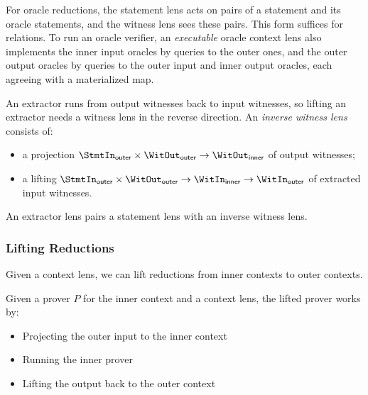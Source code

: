 \begin{definition}
    \label{def:oracle_context_lens}
    For oracle reductions, the statement lens acts on pairs of a statement and its oracle
    statements, and the witness lens sees these pairs. This form suffices for relations. To run an
    oracle verifier, an \emph{executable} oracle context lens also implements the inner input
    oracles by queries to the outer ones, and the outer output oracles by queries to the outer
    input and inner output oracles, each agreeing with a materialized map.
    \leanok
\end{definition}

\begin{definition}
    \label{def:extractor_lens}
    An extractor runs from output witnesses back to input witnesses, so lifting an extractor needs a
    witness lens in the reverse direction. An \emph{inverse witness lens} consists of:
    \begin{itemize}
        \item a projection $\StmtIn_{\mathsf{outer}} \times \WitOut_{\mathsf{outer}} \to \WitOut_{\mathsf{inner}}$ of output witnesses;
        \item a lifting $\StmtIn_{\mathsf{outer}} \times \WitOut_{\mathsf{outer}} \to \WitIn_{\mathsf{inner}} \to \WitIn_{\mathsf{outer}}$ of extracted input witnesses.
    \end{itemize}
    An extractor lens pairs a statement lens with an inverse witness lens.
    \leanok
\end{definition}

\subsubsection{Lifting Reductions}

Given a context lens, we can lift reductions from inner contexts to outer contexts.

\begin{definition}
    \label{def:prover_lift_context}
    Given a prover $P$ for the inner context and a context lens, the lifted prover works by:
    \begin{itemize}
        \item Projecting the outer input to the inner context
        \item Running the inner prover
        \item Lifting the output back to the outer context
    \end{itemize}
    \leanok
\end{definition}

